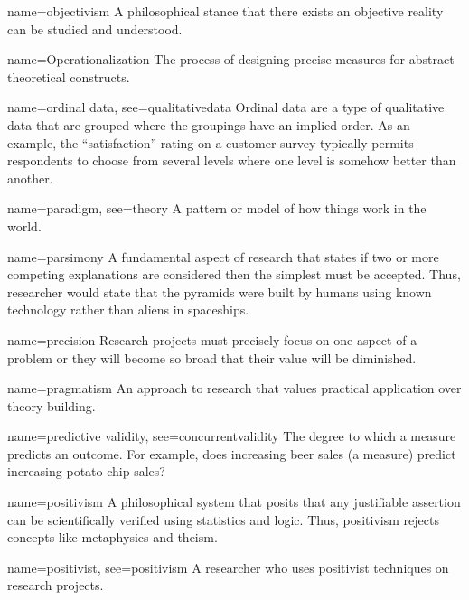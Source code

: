 {name={objectivism}}
{%
	A philosophical stance that there exists an objective reality can be studied and understood.
}


{name={Operationalization}}
{%
	 The process of designing precise measures for abstract theoretical constructs. 
}

{name={ordinal data},
	see={qualitativedata}}
{%
	Ordinal data are a type of qualitative data that are grouped where the groupings have an implied order. As an example, the ``satisfaction'' rating on a customer survey typically permits respondents to choose from several levels where one level is somehow better than another.
}

{name={paradigm},
	see={theory}}
{%
	A pattern or model of how things work in the world. 
}

	{name={parsimony}}
	{%
		A fundamental aspect of research that states if two or more competing explanations are considered then the simplest must be accepted. Thus, researcher would state that the pyramids were built by humans using known technology rather than aliens in spaceships.
	}

	{name={precision}}
	{%
		Research projects must precisely focus on one aspect of a problem or they will become so broad that their value will be diminished.
	}

{name={pragmatism}}
{%
	An approach to research that values practical application over theory-building. 
}

{name={predictive validity},
	see={concurrentvalidity}}
{%
	The degree to which a measure predicts an outcome. For example, does increasing beer sales (a measure) predict increasing potato chip sales?
}

{name={positivism}}
{%
	A philosophical system that posits that any justifiable assertion can be scientifically verified using statistics and logic. Thus, positivism rejects concepts like metaphysics and theism.
}

{name={positivist},
 see={positivism}}
{%
	A researcher who uses positivist techniques on research projects.
}


